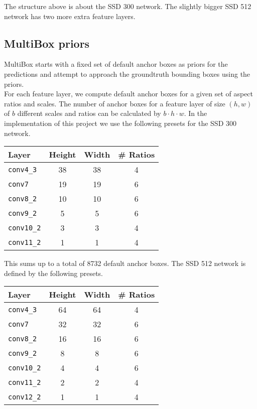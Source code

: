 The structure above is about the SSD 300 network. The slightly bigger SSD 512 network has two more extra feature layers.

\subsection{MultiBox priors}

MultiBox starts with a fixed set of default anchor boxes as priors for the predictions and attempt to approach the groundtruth bounding boxes using the priors. \\

For each feature layer, we compute default anchor boxes for a given set of aspect ratios and scales. The number of anchor boxes for a feature layer of size $(h, w)$ of $b$ different scales and ratios can be calculated by $b \cdot h \cdot w$. In the implementation of this project we use the following presets for the SSD 300 network.

\begin{center}
  \begin{tabular}{l|c|c|c}
    \textbf{Layer} & \textbf{Height} & \textbf{Width} & \textbf{\# Ratios} \\ \hline
    \texttt{conv4\_3} & 38 & 38 & 4 \\
    \texttt{conv7} & 19 & 19 & 6 \\
    \texttt{conv8\_2} & 10 & 10 & 6 \\
    \texttt{conv9\_2} & 5 & 5 & 6 \\
    \texttt{conv10\_2} & 3 & 3 & 4 \\
    \texttt{conv11\_2} & 1 & 1 & 4
  \end{tabular}
\end{center}

This sums up to a total of 8732 default anchor boxes. The SSD 512 network is defined by the following presets.

\begin{center}
  \begin{tabular}{l|c|c|c}
    \textbf{Layer} & \textbf{Height} & \textbf{Width} & \textbf{\# Ratios} \\ \hline
    \texttt{conv4\_3} & 64 & 64 & 4 \\
    \texttt{conv7} & 32 & 32 & 6 \\
    \texttt{conv8\_2} & 16 & 16 & 6 \\
    \texttt{conv9\_2} & 8 & 8 & 6 \\
    \texttt{conv10\_2} & 4 & 4 & 6 \\
    \texttt{conv11\_2} & 2 & 2 & 4 \\
    \texttt{conv12\_2} & 1 & 1 & 4
  \end{tabular}
\end{center}

